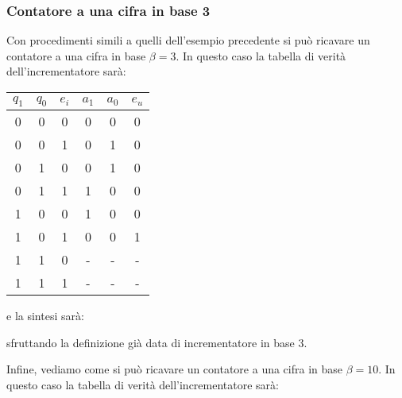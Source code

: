 \documentclass[a4paper,11pt]{article}
\begin{document}
\subsubsection{Contatore a una cifra in base 3}
Con procedimenti simili a quelli dell'esempio precedente si può ricavare un contatore a una cifra in base $\beta = 3$.
In questo caso la tabella di verità dell'incrementatore sarà:
\begin{table}[H]
	\center 
	\begin{tabular} { c c c | c c c }
		$q_1$ & $q_0$ & $e_i$ & $a_1$ & $a_0$ & $e_u$ \\ 
		\hline
		0 & 0 & 0 & 0 & 0 & 0 \\ 
		0 & 0 & 1 & 0 & 1 & 0 \\ 
		0 & 1 & 0 & 0 & 1 & 0 \\ 
		0 & 1 & 1 & 1 & 0 & 0 \\
		1 & 0 & 0 & 1 & 0 & 0 \\ 
		1 & 0 & 1 & 0 & 0 & 1 \\ 
		1 & 1 & 0 & - & - & - \\ 
		1 & 1 & 1 & - & - & -
	\end{tabular}
\end{table}

e la sintesi sarà:

sfruttando la definizione già data di incrementatore in base 3.

Infine, vediamo come si può ricavare un contatore a una cifra in base $\beta = 10$.
In questo caso la tabella di verità dell'incrementatore sarà:
\end{document}
